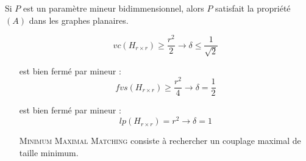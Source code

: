 \documentclass[a4paper, 11pt]{thesis}
\begin{document}
\begin{lemma}
    Si $P$ est un paramètre mineur bidimmensionnel, alors $P$ satisfait la propriété $(A)$ dans les
    graphes planaires.
\end{lemma}

\begin{ex}
    \begin{itemize}
        \item[\vcover] \[
                vc(H_{r \times r}) \geq \frac{r^2}{2} \rightarrow \delta \leq \frac{1}{\sqrt{2}}
            \]
        \item[\fvset] est bien fermé par mineur :
            \[
                fvs(H_{r \times r}) \geq \frac{r^2}{4} \rightarrow \delta = \frac{1}{2}
            \]
        \item[\lpath] est bien fermé par mineur :
            \[
                lp(H_{r \times r}) = r^2 \rightarrow \delta = 1
            \]
        \item[\textsc{Minimum Maximal Matching}] consiste à rechercher un couplage
            maximal de taille minimum.
    \end{itemize}
\end{ex}
\end{document}
